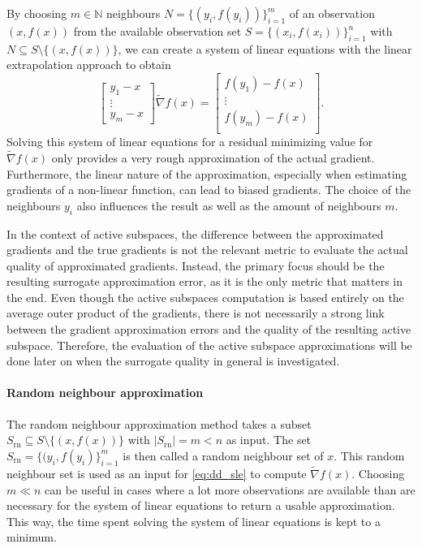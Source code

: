 \documentclass[
  a4paper,  %
  twoside,  %
  bibliography=totoc,
  headsepline,
  cleardoublepage=empty,
  parskip=half,
  draft=false
]{scrbook}
\begin{document}
By choosing $m \in \mathds{N}$ neighbours $N = \{(y_i, f(y_i))\}_{i=1}^m$ of an observation $(x, f(x))$ from the available observation set $S = \{(x_i, f(x_i))\}_{i=1}^n$ with $N \subseteq S \setminus \{(x, f(x))\}$, we can create a system of linear equations with the linear extrapolation approach to obtain
\begin{equation}
\begin{bmatrix}
    y_1 - x\\
    \vdots \\
    y_m - x
  \end{bmatrix}  \widetilde{\nabla} f(x) =\begin{bmatrix}
    f(y_1) - f(x) \\ \vdots \\  f(y_m) - f(x)
    \\
  \end{bmatrix}.
  \label{eq:dd_sle}
\end{equation}
%
Solving this system of linear equations for a residual minimizing value for $\widetilde{\nabla} f(x)$ only provides a very rough approximation of the actual gradient.
Furthermore, the linear nature of the approximation, especially when estimating gradients of a non-linear function, can lead to biased gradients.
The choice of the neighbours $y_i$ also influences the result as well as the amount of neighbours $m$.

In the context of active subspaces, the difference between the approximated gradients and the true gradients is not the relevant metric to evaluate the actual quality of approximated gradients.
Instead, the primary focus should be the resulting surrogate approximation error, as it is the only metric that matters in the end.
Even though the active subspaces computation is based entirely on the average outer product of the gradients, there is not necessarily a strong link between the gradient approximation errors and the quality of the resulting active subspace.
Therefore, the evaluation of the active subspace approximations will be done later on when the surrogate quality in general is investigated.

\paragraph{Random neighbour approximation}
The random neighbour approximation method takes a subset $S_{\text{rn}} \subseteq S \setminus \{(x, f(x))\}$ with $|S_{\text{rn}}|=m < n$ as input.
The set $S_{\text{rn}}=\{(y_i, f(y_i)\}_{i=1}^m$ is then called a random neighbour set of $x$.
This random neighbour set is used as an input for \cref{eq:dd_sle} to compute $\widetilde{\nabla} f(x)$.
Choosing $m \ll n$ can be useful in cases where a lot more observations are available than are necessary for the system of linear equations to return a usable approximation.
This way, the time spent solving the system of linear equations is kept to a minimum.
\end{document}
